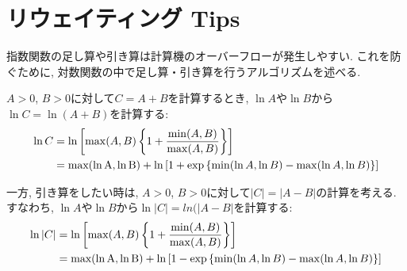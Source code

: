 
\section{リウェイティング Tips}
指数関数の足し算や引き算は計算機のオーバーフローが発生しやすい. 
これを防ぐために,  対数関数の中で足し算・引き算を行うアルゴリズムを述べる.\cite{Berg2003}

$A>0$, $B>0$に対して$C = A + B$を計算するとき, $\ln A$や$\ln B$から$\ln C = \ln (A + B)$を計算する:
\begin{align}
 \ln C
&=
 \ln \left[ \mathrm{max} (A, B)
            \left\{1 + \frac{\mathrm{min}{(A, B)}}{\mathrm{max}{(A, B)}} \right\}
     \right]
\notag
\\
&=
 \mathrm{max (\ln A, \ln B)}
+\ln
 \left[ 1 + \exp
            \left\{ \mathrm{min}(\ln A, \ln B)- \mathrm{max}(\ln A, \ln B) \right\}
 \right]
\end{align}

一方, 引き算をしたい時は, $A>0$, $B>0$に対して$|C| = |A - B|$の計算を考える. 
すなわち, $\ln A$や$\ln B$から$\ln |C| = ln (|A - B|$を計算する:
\begin{align}
 \ln |C|
&=
 \ln \left[ \mathrm{max} (A, B)
            \left\{1 + \frac{\mathrm{min}{(A, B)}}{\mathrm{max}{(A, B)}} \right\}
     \right]
\notag
\\
&=
 \mathrm{max (\ln A, \ln B)}
+\ln
 \left[ 1 - \exp
            \left\{ \mathrm{min}(\ln A, \ln B)- \mathrm{max}(\ln A, \ln B) \right\}
 \right]
\end{align}



\clearpage



